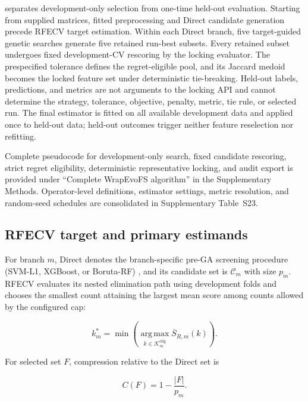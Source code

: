  separates development-only selection from one-time held-out evaluation. Starting from supplied matrices, fitted preprocessing and Direct candidate generation precede RFECV target estimation. Within each Direct branch, five target-guided genetic searches generate five retained run-best subsets. Every retained subset undergoes fixed development-CV rescoring by the locking evaluator. The prespecified tolerance defines the regret-eligible pool, and its Jaccard medoid becomes the locked feature set under deterministic tie-breaking. Held-out labels, predictions, and metrics are not arguments to the locking API and cannot determine the strategy, tolerance, objective, penalty, metric, tie rule, or selected run. The final estimator is fitted on all available development data and applied once to held-out data; held-out outcomes trigger neither feature reselection nor refitting.

Complete pseudocode for development-only search, fixed candidate rescoring, strict regret eligibility, deterministic representative locking, and audit export is provided under ``Complete WrapEvoFS algorithm'' in the Supplementary Methods. Operator-level definitions, estimator settings, metric resolution, and random-seed schedules are consolidated in Supplementary Table~S23.

\subsection{RFECV target and primary estimands}

For branch \(m\), Direct denotes the branch-specific pre-GA screening procedure (SVM-L1, XGBoost, or Boruta-RF) \citep{ref10,ref11,ref13}, and its candidate set is \(\mathcal C_m\) with size \(p_m\). RFECV evaluates its nested elimination path using development folds and chooses the smallest count attaining the largest mean score among counts allowed by the configured cap:

\begin{equation}
k_m^{\ast}=\min\left(\operatorname*{arg\,max}_{k\in\mathcal K_m^{\mathrm{elig}}}\overline S_{R,m}(k)\right).
\label{eq:rfecv-target}
\end{equation}

For selected set \(F\), compression relative to the Direct set is

\begin{equation}
C(F)=1-\frac{|F|}{p_m}.
\label{eq:compression}
\end{equation}


